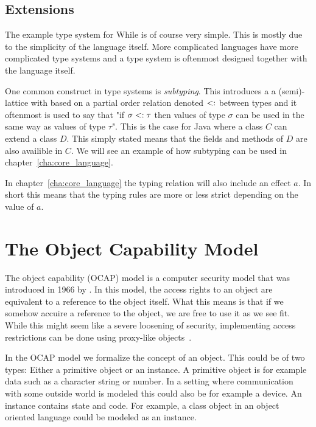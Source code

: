 \subsection{Extensions}
\label{sub:extensions}

The example type system for While is of course very simple. This is mostly due
to the simplicity of the language itself. More complicated languages have more
complicated type systems and a type system is oftenmost designed together 
with the language itself. 

One common construct in type systems is \emph{subtyping}. This introduces a a
(semi)-lattice with based on a partial order relation denoted $<:$ between
types and it oftenmost is used to say that "if $\sigma <: \tau$ then values
of type $\sigma$ can be used in the same way as values of type $\tau$". This is
the case for Java where a class $C$ can extend a class $D$. This simply
stated means that the fields and methods of $D$ are also availible in $C$. We
will see an example of how subtyping can be used in
chapter~\ref{cha:core_language}. 

In chapter~\ref{cha:core_language} the typing relation will also include an
effect $a$. In short this means that the typing rules are more or less strict
depending on the value of $a$.

\section{The Object Capability Model}%
\label{sec:the_object_capability_model}

The object capability (OCAP) model is a computer security model that was
introduced in 1966 by \textcite{Dennis-VanHorn66}. In this model, the access
rights to an object are equivalent to a reference to the object itself. What
this means is that if we somehow accuire a reference to the object, we are free
to use it as we see fit. While this might seem like a severe loosening of
security, implementing access restrictions can be done using proxy-like
objects~\parencite{Miller06b}.

In the OCAP model we formalize the concept of an object. This could be of
two types: Either a primitive object or an instance. A primitive object is
for example data such as a character string or number. In a setting where
communication with some outside world is modeled this could also be for example
a device. An instance contains state and code. For example, a class
object in an object oriented language could be modeled as an
instance.

